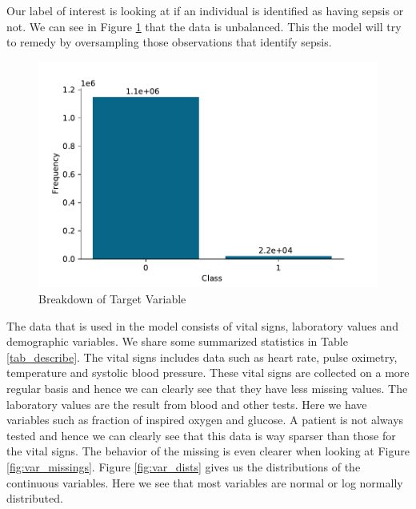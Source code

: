 \documentclass[10pt,letterpaper]{article}
\begin{document}
\par Our label of interest is looking at if an individual is identified as having sepsis or not. We can see in Figure \ref{fig:label_dist} that the data is unbalanced. This the model will try to remedy by oversampling those observations that identify sepsis.

\begin{figure}[htbp!]
    \centering
    \includegraphics[scale = 0.7]{Label_dist.pdf}
    \caption{Breakdown of Target Variable}
    \label{fig:label_dist}
\end{figure}

\par The data that is used in the model consists of vital signs, laboratory values and demographic variables. We share some summarized statistics in Table \ref{tab_describe}. The vital signs includes data such as heart rate, pulse oximetry, temperature and systolic blood pressure. These vital signs are collected on a more regular basis and hence we can clearly see that they have less missing values. The laboratory values are the result from blood and other tests. Here we have variables such as fraction of inspired oxygen and glucose. A patient is not always tested and hence we can clearly see that this data is way sparser than those for the vital signs. The behavior of the missing is even clearer when looking at Figure \ref{fig:var_missings}. Figure \ref{fig:var_dists} gives us the distributions of the continuous variables. Here we see that most variables are normal or log normally distributed. 


\end{document}

